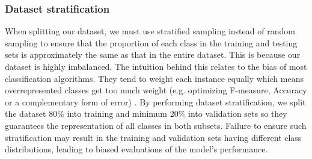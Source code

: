 \subsubsection{Dataset stratification}
When splitting our dataset, we must use stratified sampling instead of random sampling to ensure that the proportion of each class in the training and testing sets is approximately the same as that in the entire dataset. This is because our dataset is highly imbalanced. The intuition behind this relates to the bias of most classification algorithms. They tend to weight each instance equally which means overrepresented classes get too much weight (e.g. optimizing F-measure, Accuracy or a complementary form of error) \cite{powers2015f}. By performing dataset stratification, we split the dataset 80\% into training and minimum 20\% into validation sets so they guarantees the representation of all classes in both subsets. Failure to ensure such stratification may result in the training and validation sets having different class distributions, leading to biased evaluations of the model's performance. 

